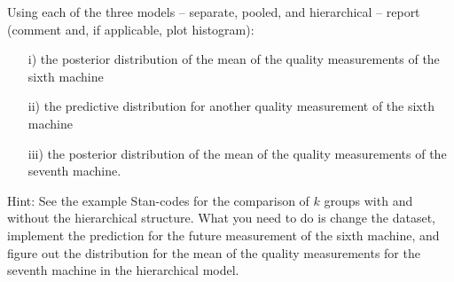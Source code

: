 \documentclass[a4paper,11pt]{article}
\begin{document}
Using each of the three models -- separate, pooled, and hierarchical -- report (comment and, if applicable, plot histogram):
\begin{itemize}
	\item [i)] the posterior distribution of the mean of the quality measurements of the sixth machine
	\item [ii)] the predictive distribution for another quality measurement of the sixth machine
	\item [iii)] the posterior distribution of the mean of the quality measurements of the seventh machine.
\end{itemize}

Hint:
See the example Stan-codes for the comparison of $k$ groups with and without the hierarchical structure. What you need to do is change the dataset, implement the prediction for the future measurement of the sixth machine, and figure out the distribution for the mean of the quality measurements for the seventh machine in the hierarchical model.
\end{document}
